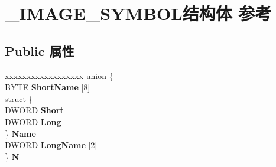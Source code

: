 \hypertarget{struct___i_m_a_g_e___s_y_m_b_o_l}{}\section{\+\_\+\+I\+M\+A\+G\+E\+\_\+\+S\+Y\+M\+B\+O\+L结构体 参考}
\label{struct___i_m_a_g_e___s_y_m_b_o_l}
\subsection*{Public 属性}
\begin{DoxyCompactItemize}
\item 
\mbox{\label{struct___i_m_a_g_e___s_y_m_b_o_l_a6875fad3fce16b3851ed2982c1bbe9a8}} 
\begin{tabbing}
xx\=xx\=xx\=xx\=xx\=xx\=xx\=xx\=xx\=\kill
union \{\\
\>BYTE {\bfseries ShortName} \mbox{[}8\mbox{]}\\
\>struct \{\\
\>\>DWORD {\bfseries Short}\\
\>\>DWORD {\bfseries Long}\\
\>\} {\bfseries Name}\\
\>DWORD {\bfseries LongName} \mbox{[}2\mbox{]}\\
\} {\bfseries N}\\


\end{tabbing}
\end{DoxyCompactItemize}
